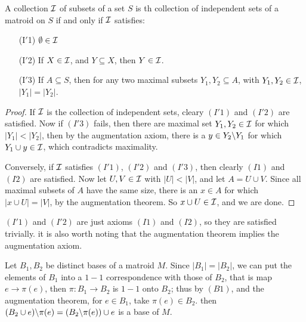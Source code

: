 \begin{theorem}\label{1.4.2}
    A collection $\mathcal{I}$ of subsets of a set  $S$ is th collection of independent sets of a matroid
    on  $S$ if and only if  $\mathcal{I}$ satisfies:
        \begin{enumerate}
            \item[(I$'$1)] $\emptyset \in \mathcal{I}$

            \item[(I$'$2)] If $X \in \mathcal{I}$, and  $Y \subseteq X$, then  $Y \in \mathcal{I}$.

            \item [(I$'$3)] If $A \subseteq S$, then for any two maximal subsets  $ Y_1,Y_2
                \subseteq A$, with $ Y_1,Y_2 \in \mathcal{I}$, $|Y_1|=|Y_2|$.
        \end{enumerate}
\end{theorem}
\begin{proof}
    If $\mathcal{I}$ is the collection of independent sets, cleary $(I'1)$ and $(I'2)$ are satisfied. Now if
    $(I'3)$ fails, then there are maximal set $ Y_1,Y_2 \in \mathcal{I}$ for which $|Y_1|<|Y_2|$, then by
    the augmentation axiom, there is a $y \in Y_2\backslash Y_1$ for which $ Y_1 \cup y \in \mathcal{I}$, which
    contradicts maximality.

    Conversely, if $\mathcal{I}$ satisfies  $(I'1)$, $(I'2)$ and $(I'3)$, then clearly $(I1)$ and $(I2)$ are
    satisfied. Now let $U,V \in \mathcal{I}$ with  $|U|<|V|$, and let  $A=U \cup V$. Since all maximal
    subsets of  $A$ have the same size, there is an  $x \in A$ for which  $|x \cup U|=|V|$, by the
    augmentation theorem. So  $x \cup U \in \mathcal{I}$, and we are done.
\end{proof}
\begin{remark}
    $(I'1)$ and $(I'2)$ are just axioms $(I1)$ and $(I2)$, so they are satisfied trivially. it is
    also worth noting that the augmentation theorem implies the augmentation axiom.
\end{remark}

\begin{example}
    Let $ B_1,B_2$ be distinct bases of a matroid $M$. Since $|B_1|=|B_2|$, we can put the elements
    of $ B_1$ into a $1-1$ correspondence with those of  $ B_2$, that is map $e \rightarrow \pi(e)$,
    then $\pi:B_1 \rightarrow B_2$ is $1-1$ onto  $B_2$; thus by $(B1)$, and the augmentation
    theorem, for $e \in B_1$, take $\pi(e) \in B_2$. then $(B_2 \cup
    e)\backslash\pi(e)=(B_2\backslash\pi(e)) \cup e$ is a base of $M$.
\end{example} 

